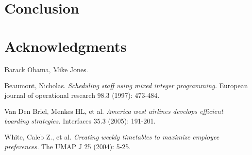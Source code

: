\documentclass[12pt]{article}
\begin{document}
\section*{Conclusion}

\section*{Acknowledgments}
Barack Obama, Mike Jones. 


\begin{thebibliography}{9}
Beaumont, Nicholas. \emph{Scheduling staff using mixed integer programming.} European journal of operational research 98.3 (1997): 473-484.

 Van Den Briel, Menkes HL, et al. \emph{America west airlines develops efficient boarding strategies.} Interfaces 35.3 (2005): 191-201.

White, Caleb Z., et al. \emph{Creating weekly timetables to maximize employee preferences.} The UMAP J 25 (2004): 5-25.


\end{thebibliography}
\end{document}
